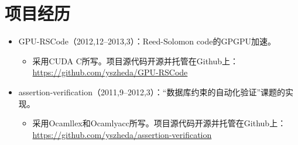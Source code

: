 \documentclass[letterpaper]{article}
\begin{document}
\section*{项目经历}
\begin{itemize}
  \item GPU-RSCode（2012,12--2013,3）：Reed-Solomon code的GPGPU加速。
	\begin{itemize}
	  \item 采用CUDA C所写。项目源代码开源并托管在Github上：\\
			  \url{https://github.com/yszheda/GPU-RSCode}
	\end{itemize}
  \item assertion-verification（2011,9--2012,3）：``数据库约束的自动化验证''课题的实现。
	\begin{itemize}
	  \item 采用Ocamllex和Ocamlyacc所写。项目源代码开源并托管在Github上：\\
			  \url{https://github.com/yszheda/assertion-verification}
	\end{itemize}

\end{itemize}
\end{document}
